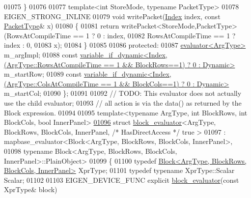 \begin{DoxyCode}
01075   \}
01076   
01077   \textcolor{keyword}{template}<\textcolor{keywordtype}{int} StoreMode, \textcolor{keyword}{typename} PacketType>
01078   EIGEN\_STRONG\_INLINE
01079   \textcolor{keywordtype}{void} writePacket(\hyperlink{namespace_eigen_a62e77e0933482dafde8fe197d9a2cfde}{Index} index, \textcolor{keyword}{const} \hyperlink{struct_eigen_1_1_packet_type}{PacketType}& x) 
01080   \{
01081     \textcolor{keywordflow}{return} writePacket<StoreMode,PacketType>(RowsAtCompileTime == 1 ? 0 : index,
01082                                              RowsAtCompileTime == 1 ? index : 0,
01083                                              x);
01084   \}
01085  
01086 \textcolor{keyword}{protected}:
01087   \hyperlink{struct_eigen_1_1internal_1_1evaluator}{evaluator<ArgType>} m\_argImpl;
01088   \textcolor{keyword}{const} 
      \hyperlink{class_eigen_1_1internal_1_1variable__if__dynamic}{variable\_if\_dynamic<Index, (ArgType::RowsAtCompileTime == 1 && BlockRows==1) ? 0 : Dynamic>}
       m\_startRow;
01089   \textcolor{keyword}{const} 
      \hyperlink{class_eigen_1_1internal_1_1variable__if__dynamic}{variable\_if\_dynamic<Index, (ArgType::ColsAtCompileTime == 1 && BlockCols==1) ? 0 : Dynamic>}
       m\_startCol;
01090 \};
01091 
01092 \textcolor{comment}{// TODO: This evaluator does not actually use the child evaluator; }
01093 \textcolor{comment}{// all action is via the data() as returned by the Block expression.}
01094 
01095 \textcolor{keyword}{template}<\textcolor{keyword}{typename} ArgType, \textcolor{keywordtype}{int} BlockRows, \textcolor{keywordtype}{int} BlockCols, \textcolor{keywordtype}{bool} InnerPanel> 
\hyperlink{struct_eigen_1_1internal_1_1block__evaluator_3_01_arg_type_00_01_block_rows_00_01_block_cols_00_01_inner_panel_00_01true_01_4}{01096} \textcolor{keyword}{struct }\hyperlink{struct_eigen_1_1internal_1_1block__evaluator}{block\_evaluator}<ArgType, BlockRows, BlockCols, InnerPanel, \textcolor{comment}{/* HasDirectAccess */} true
      >
01097   : mapbase\_evaluator<Block<ArgType, BlockRows, BlockCols, InnerPanel>,
01098                       typename Block<ArgType, BlockRows, BlockCols, InnerPanel>::PlainObject>
01099 \{
01100   \textcolor{keyword}{typedef} \hyperlink{group___core___module_class_eigen_1_1_block}{Block<ArgType, BlockRows, BlockCols, InnerPanel>} 
      XprType;
01101   \textcolor{keyword}{typedef} \textcolor{keyword}{typename} XprType::Scalar Scalar;
01102 
01103   EIGEN\_DEVICE\_FUNC \textcolor{keyword}{explicit} \hyperlink{struct_eigen_1_1internal_1_1block__evaluator}{block\_evaluator}(\textcolor{keyword}{const} XprType& block)

\end{DoxyCode}
